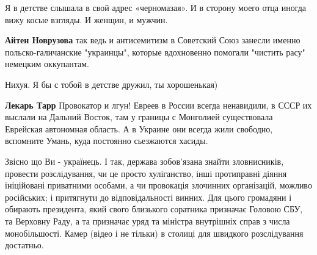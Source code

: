 \begin{itemize}
 
Я в детстве слышала в свой адрес «черномазая». И в сторону моего отца иногда
вижу косые взгляды. И женщин, и мужчин.

\begin{itemize}
 
\textbf{Айтен Новрузова} так ведь и антисемитизм в Советский Союз занесли
именно польско-галичанские "украинцы", которые вдохновенно помогали "чистить
расу" немецким оккупантам.

 
Нихуя. Я бы с тобой в детстве дружил, ты хорошенькая)

 
\textbf{Лекарь Тарр} Провокатор и лгун! Евреев в России всегда ненавидили, в
СССР их выслали на Дальний Восток, там у границы с Монголией существовала
Еврейская автономная область. А в Украине они всегда жили свободно, вспомните
Умань, куда постоянно сьезжаются хасиды.
\end{itemize}

 

Звісно що Ви - українець. І так, держава зобов’язана знайти зловнисників,
провести розслідування, чи це просто хуліганство, інші протиправні діяння
ініційовані приватними особами, а чи провокація злочинних організацій, можливо
російських; і притягнути до відповідальності винних. Для цього громадяни і
обирають президента, який свого близького соратника призначає Головою СБУ, та
Верховну Раду, а та призначає уряд та міністра внутрішніх справ з числа
монобільшості. Камер (відео і не тільки) в столиці для швидкого розслідування
достатньо.


\end{itemize}
